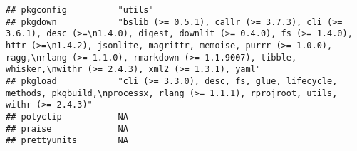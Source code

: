 \documentclass[
]{article}
\begin{document}
\begin{verbatim}
## pkgconfig          "utils"                                                                                                                                                                                                                                                                                                                                                                                                                                      
## pkgdown            "bslib (>= 0.5.1), callr (>= 3.7.3), cli (>= 3.6.1), desc (>=\n1.4.0), digest, downlit (>= 0.4.0), fs (>= 1.4.0), httr (>=\n1.4.2), jsonlite, magrittr, memoise, purrr (>= 1.0.0), ragg,\nrlang (>= 1.1.0), rmarkdown (>= 1.1.9007), tibble, whisker,\nwithr (>= 2.4.3), xml2 (>= 1.3.1), yaml"                                                                                                                                              
## pkgload            "cli (>= 3.3.0), desc, fs, glue, lifecycle, methods, pkgbuild,\nprocessx, rlang (>= 1.1.1), rprojroot, utils, withr (>= 2.4.3)"                                                                                                                                                                                                                                                                                                              
## polyclip           NA                                                                                                                                                                                                                                                                                                                                                                                                                                           
## praise             NA                                                                                                                                                                                                                                                                                                                                                                                                                                           
## prettyunits        NA                                                                                                                                                                                                                                                                                                                                                                                                                                           

\end{verbatim}
\end{document}
